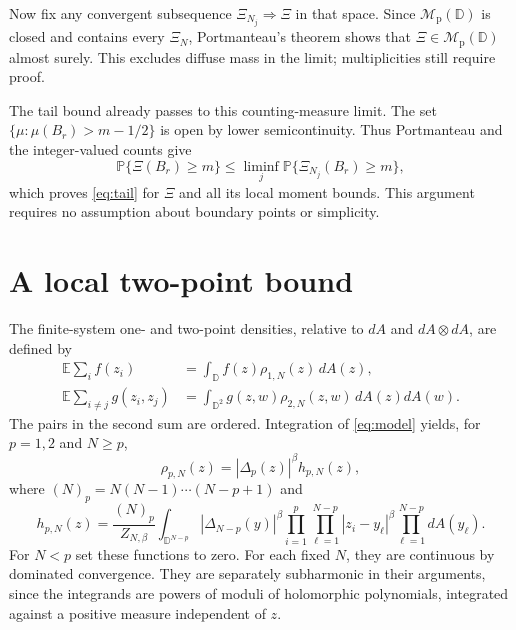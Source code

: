 \documentclass[11pt,a4paper]{article}
\numberwithin{equation}{section}
\theoremstyle{remark}
\newcommand{\D}{\mathbb D}
\newcommand{\E}{\mathbb E}
\newcommand{\Prob}{\mathbb P}
\newcommand{\Mp}{\mathcal M_{\mathrm p}}
\begin{document}
Now fix any convergent subsequence $\Xi_{N_j}\Rightarrow\Xi$ in
that space. Since $\Mp(\D)$ is closed and contains every $\Xi_N$,
Portmanteau's theorem shows that $\Xi\in\Mp(\D)$ almost surely.
This excludes diffuse mass in the limit; multiplicities still require
proof.

The tail bound already passes to this counting-measure limit.
The set
$\{\mu:\mu(B_r)>m-1/2\}$ is open by lower semicontinuity. Thus
Portmanteau and the integer-valued counts give
\[
 \Prob\{\Xi(B_r)\ge m\}
 \le\liminf_j\Prob\{\Xi_{N_j}(B_r)\ge m\},
\]
which proves \eqref{eq:tail} for $\Xi$ and all its local moment
bounds. This argument requires no assumption about boundary points
or simplicity.

\section{A local two-point bound}

The finite-system one- and two-point densities, relative to $dA$
and $dA\otimes dA$, are defined by
\begin{align*}
 \E\sum_i f(z_i)&=\int_\D f(z)\rho_{1,N}(z)\,dA(z),\\
 \E\sum_{i\ne j}g(z_i,z_j)
 &=\int_{\D^2}g(z,w)\rho_{2,N}(z,w)\,dA(z)dA(w).
\end{align*}
The pairs in the second sum are ordered.
Integration of \eqref{eq:model} yields, for $p=1,2$ and $N\ge p$,
\begin{equation}\label{eq:correlation-factorization}
 \rho_{p,N}(z)=|\Delta_p(z)|^\beta h_{p,N}(z),
\end{equation}
where $(N)_p=N(N-1)\cdots(N-p+1)$ and
\begin{equation}\label{eq:h-definition}
 h_{p,N}(z)=\frac{(N)_p}{Z_{N,\beta}}
 \int_{\D^{N-p}}|\Delta_{N-p}(y)|^\beta
     \prod_{i=1}^p\prod_{\ell=1}^{N-p}|z_i-y_\ell|^\beta
           \prod_{\ell=1}^{N-p}dA(y_\ell).
\end{equation}
For $N<p$ set these functions to zero. For each fixed $N$, they
are continuous by dominated convergence. They are separately
subharmonic in their arguments, since the integrands are powers of
moduli of holomorphic polynomials, integrated against a positive
measure independent of $z$.
\end{document}
